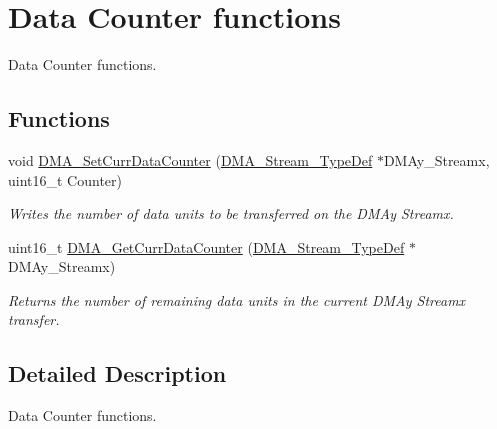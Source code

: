 \hypertarget{group___d_m_a___group2}{}\section{Data Counter functions}
\label{group___d_m_a___group2}


Data Counter functions.  


\subsection*{Functions}
\begin{DoxyCompactItemize}
\item 
void \hyperlink{group___d_m_a___group2_ga6a11a2c951cff59b125ba8857d44e3f3}{D\+M\+A\+\_\+\+Set\+Curr\+Data\+Counter} (\hyperlink{struct_d_m_a___stream___type_def}{D\+M\+A\+\_\+\+Stream\+\_\+\+Type\+Def} $\ast$D\+M\+Ay\+\_\+\+Streamx, uint16\+\_\+t Counter)
\begin{DoxyCompactList}\small\item\em Writes the number of data units to be transferred on the D\+M\+Ay Streamx. \end{DoxyCompactList}\item 
uint16\+\_\+t \hyperlink{group___d_m_a___group2_ga4a76444a92423f5f15a4328738d6dc46}{D\+M\+A\+\_\+\+Get\+Curr\+Data\+Counter} (\hyperlink{struct_d_m_a___stream___type_def}{D\+M\+A\+\_\+\+Stream\+\_\+\+Type\+Def} $\ast$D\+M\+Ay\+\_\+\+Streamx)
\begin{DoxyCompactList}\small\item\em Returns the number of remaining data units in the current D\+M\+Ay Streamx transfer. \end{DoxyCompactList}\end{DoxyCompactItemize}


\subsection{Detailed Description}
Data Counter functions. 


